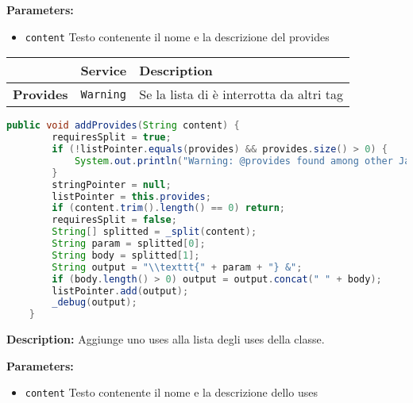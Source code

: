\documentclass{article}
\begin{document}
\textbf{Parameters:}
\begin{itemize}
  \item\texttt{content} Testo contenente il nome e la descrizione del provides  
\end{itemize}

\begin{table}[!h]\centering
\begin{tabular}{|l|p{}|p{}|}
\hline & \textbf{Service} & \textbf{Description} \\ \hline
\multirow{1}{*}{\textbf{Provides}}
& \texttt{Warning} & Se la lista di è interrotta da altri tag \\
\hline
\end{tabular}\end{table}
\begin{lstlisting}[language=Java]
    public void addProvides(String content) {
        requiresSplit = true;
        if (!listPointer.equals(provides) && provides.size() > 0) {
            System.out.println("Warning: @provides found among other Javadoc keywords. You should put all @provides together.");
        }
        stringPointer = null;
        listPointer = this.provides;
        if (content.trim().length() == 0) return;
        requiresSplit = false;
        String[] splitted = _split(content);
        String param = splitted[0];
        String body = splitted[1];
        String output = "\\texttt{" + param + "} &";
        if (body.length() > 0) output = output.concat(" " + body);
        listPointer.add(output);
        _debug(output);
    }
\end{lstlisting}
\vspace{0.5cm}
\textbf{Description:}  Aggiunge uno uses alla lista degli uses della classe. 

\textbf{Parameters:}
\begin{itemize}
  \item\texttt{content} Testo contenente il nome e la descrizione dello uses  
\end{itemize}
\end{document}
